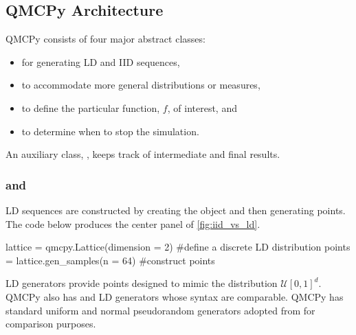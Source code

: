 \documentclass[11pt]{NSFamsart}
\newcommand{\calu}{{\mathcal{U}}}
\begin{document}
\subsection*{QMCPy Architecture}

QMCPy consists of four major abstract classes:
\begin{itemize}
	\item {} for generating LD and IID sequences,
	\item {} to accommodate more general distributions or measures,
	\item {} to define the particular function, $f$, of interest, and
	\item {} to determine when to stop the simulation.
\end{itemize}
An auxiliary class, , keeps track of intermediate and final results.

\subsubsection*{\textup{ and }} LD sequences are constructed by creating the object and then generating points.  The code below produces the center panel of \cref{fig:iid_vs_ld}.
\begin{pythoncode}
lattice = qmcpy.Lattice(dimension = 2) #define a discrete LD distribution
points = lattice.gen_samples(n = 64)   #construct points
\end{pythoncode}
\indent LD generators provide points designed to mimic the distribution $\calu[0,1]^d$.  QMCPy also has  \cite{DicPil10a} and  \cite{Hal60} LD generators whose syntax are comparable. QMCPy  has standard uniform and normal pseudorandom generators adopted from  for comparison purposes.  
\end{document}
